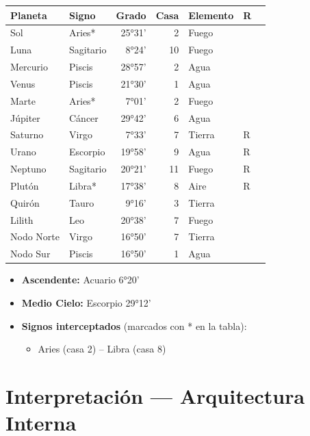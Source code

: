 \documentclass[11pt,a4paper]{article}
\begin{document}
\begin{center}
\begin{tabular}{llrrlll}
  \toprule
  \textbf{Planeta} & \textbf{Signo} & \textbf{Grado} & \textbf{Casa} &
  \textbf{Elemento} & \textbf{R} \\
  \midrule
  Sol & Aries* & 25°31' & 2 & Fuego &  \\
  Luna & Sagitario & 8°24' & 10 & Fuego &  \\
  Mercurio & Piscis & 28°57' & 2 & Agua &  \\
  Venus & Piscis & 21°30' & 1 & Agua &  \\
  Marte & Aries* & 7°01' & 2 & Fuego &  \\
  Júpiter & Cáncer & 29°42' & 6 & Agua &  \\
  Saturno & Virgo & 7°33' & 7 & Tierra & R \\
  Urano & Escorpio & 19°58' & 9 & Agua & R \\
  Neptuno & Sagitario & 20°21' & 11 & Fuego & R \\
  Plutón & Libra* & 17°38' & 8 & Aire & R \\
  Quirón & Tauro & 9°16' & 3 & Tierra &  \\
  Lilith & Leo & 20°38' & 7 & Fuego &  \\
  Nodo Norte & Virgo & 16°50' & 7 & Tierra &  \\
  Nodo Sur & Piscis & 16°50' & 1 & Agua &  \\
  \bottomrule
\end{tabular}
\end{center}

\vspace{0.5cm}
\begin{itemize}
  \item \textbf{Ascendente:} Acuario 6°20'
  \item \textbf{Medio Cielo:} Escorpio 29°12'
  \item \textbf{Signos interceptados} (marcados con * en la tabla):
  \begin{itemize}
  \item Aries (casa 2) -- Libra (casa 8)
  \end{itemize}
\end{itemize}

\newpage

\section{Interpretación — Arquitectura Interna}
\end{document}
